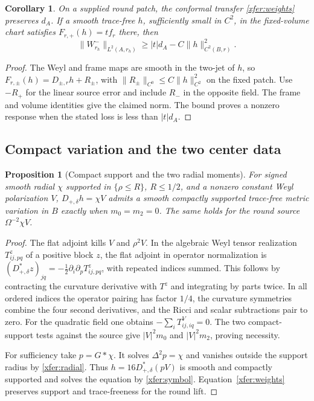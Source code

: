 \documentclass[11pt]{article}
\numberwithin{equation}{section}
\newtheorem{proposition}[theorem]{Proposition}
\newtheorem{corollary}[theorem]{Corollary}
\theoremstyle{definition}
\theoremstyle{remark}
\begin{document}
\begin{corollary}\label{xfer:local-nonlinear}
On a supplied round patch, the conformal transfer
\eqref{xfer:weights} preserves \(d_A\). If a smooth trace-free
\(h\), sufficiently small in \(C^2\), in the fixed-volume chart satisfies
\(F_{r,+}(h)=tf_r\) there, then
\[
 \|W_{r_h}^-\|_{L^2(A,r_h)}\ge |t|d_A-C\|h\|_{C^2(B,r)}^2 .
\]
\end{corollary}

\begin{proof}
The Weyl and frame maps are smooth in the two-jet of \(h\), so
\(F_{r,\pm}(h)=D_{\pm,r}h+R_\pm\), with
\(\|R_\pm\|_{C^0}\le C\|h\|_{C^2}^2\) on the fixed patch.
Use \(-R_+\) for the linear source error and include \(R_-\)
in the opposite field. The frame and volume identities give
the claimed norm. The bound proves a nonzero response when
the stated loss is less than \(|t|d_A\).
\end{proof}

\subsection{Compact variation and the two center data}

\begin{proposition}[Compact support and the two radial moments]\label{xfer:compact}
For signed smooth radial \(\chi\) supported in \(\{\rho\le R\}\),
\(R\le1/2\), and a nonzero constant Weyl polarization \(V\),
\(D_{+,\delta}h=\chi V\) admits a smooth compactly supported
trace-free metric variation in \(B\) exactly when \(m_0=m_2=0\).
The same holds for the round source \(\Omega^{-2}\chi V\).
\end{proposition}

\begin{proof}
The flat adjoint kills \(V\) and \(\rho^2V\). In the algebraic
Weyl tensor realization \(T^z_{ij,pq}\) of a positive block
\(z\), the flat adjoint in operator normalization is
\((D_{+,\delta}^*z)_{jq}=-\tfrac12\partial_i\partial_p T^z_{ij,pq}\),
with repeated indices summed. This follows by contracting the
curvature derivative with \(T^z\) and integrating by parts twice. In
all ordered indices the operator pairing has factor \(1/4\),
the curvature symmetries combine the four second derivatives, and
the Ricci and scalar subtractions pair to zero.
For the quadratic field one obtains \(-\sum_iT^V_{ij,iq}=0\).
The two compact-support tests against the source give
\(|V|^2m_0\) and \(|V|^2m_2\), proving necessity.

For sufficiency take \(p=G*\chi\). It solves \(\Delta^2p=\chi\)
and vanishes outside the support radius by \eqref{xfer:radial}.
Thus \(h=16D_{+,\delta}^*(pV)\) is smooth and compactly supported
and solves the equation by \eqref{xfer:symbol}.
Equation~\eqref{xfer:weights} preserves support and
trace-freeness for the round lift.
\end{proof}
\end{document}
